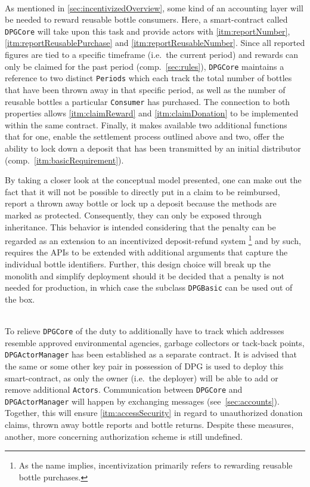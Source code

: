 \begin{description}[format={\storedescriptionlabel}]
	\item[Accounting\label{itm:accounting}]
	\hfill \\
	As mentioned in \autoref{sec:incentivizedOverview}, some kind of an accounting layer will be needed to reward reusable bottle consumers. Here, a smart-contract called \texttt{DPGCore} will take upon this task and provide actors with \ref{itm:reportNumber}, \ref{itm:reportReusablePurchase} and \ref{itm:reportReusableNumber}. Since all reported figures are tied to a specific timeframe (i.e.~the current period) and rewards can only be claimed for the past period (comp.~\ref{sec:rules}), \texttt{DPGCore} maintains a reference to two distinct \texttt{Periods} which each track the total number of bottles that have been thrown away in that specific period, as well as the number of reusable bottles a particular \texttt{Consumer} has purchased. The connection to both properties allows \ref{itm:claimReward} and \ref{itm:claimDonation} to be implemented within the same contract. Finally, it makes available two additional functions that for one, enable the settlement process outlined above and two, offer the ability to lock down a deposit that has been transmitted by an initial distributor (comp.~\ref{itm:basicRequirement}). 
	
	By taking a closer look at the conceptual model presented, one can make out the fact that it will not be possible to directly put in a claim to be reimbursed, report a thrown away bottle or lock up a deposit because the methods are marked as protected. Consequently, they can only be exposed through inheritance. This behavior is intended considering that the penalty can be regarded as an extension to an incentivized deposit-refund system \footnote{As the name implies, incentivization primarily refers to rewarding reusable bottle purchases.} and by such, requires the APIs to be extended with additional arguments that capture the individual bottle identifiers. Further, this design choice will break up the monolith and simplify deployment should it be decided that a penalty is not needed for production, in which case the subclass \texttt{DPGBasic} can be used out of the box.
	\item[Access Control\label{itm:accessControl}]
	\hfill \\
	To relieve \texttt{DPGCore} of the duty to additionally have to track which addresses resemble approved environmental agencies, garbage collectors or tack-back points, \texttt{DPGActorManager} has been established as a separate contract. It is advised that the same or some other key pair in possession of \ac{DPG} is used to deploy this smart-contract, as only the owner (i.e.~the deployer) will be able to add or remove additional \texttt{Actors}. Communication between \texttt{DPGCore} and \texttt{DPGActorManager} will happen by exchanging messages (see~\ref{sec:accounts}). Together, this will ensure \ref{itm:accessSecurity} in regard to unauthorized donation claims, thrown away bottle reports and bottle returns. Despite these measures, another, more concerning authorization scheme is still undefined. 
	

\end{description}
